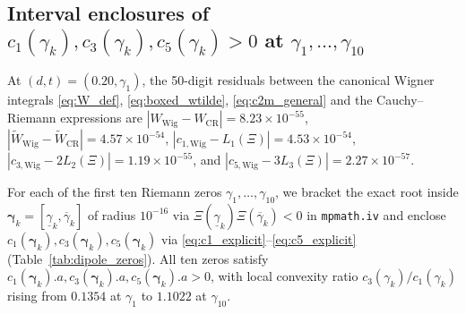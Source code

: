 \documentclass[11pt,a4paper,reqno]{amsart}
\theoremstyle{definition}
\theoremstyle{remark}
\numberwithin{equation}{section}
\newcommand{\Wtil}{\widetilde{W}}
\begin{document}
\subsection{Interval enclosures of \texorpdfstring{$c_1(\gamma_k), c_3(\gamma_k), c_5(\gamma_k) > 0$}{c1, c3, c5 > 0} at \texorpdfstring{$\gamma_1, \dots, \gamma_{10}$}{gamma\_1..gamma\_10}}\label{subsec:num_dipoles}

At $(d,t) = (0.20, \gamma_1)$, the 50-digit residuals between the canonical Wigner integrals \eqref{eq:W_def}, \eqref{eq:boxed_wtilde}, \eqref{eq:c2m_general} and the Cauchy--Riemann expressions are $|W_{\mathrm{Wig}} - W_{\mathrm{CR}}| = 8.23 \times 10^{-55}$, $|\Wtil_{\mathrm{Wig}} - \Wtil_{\mathrm{CR}}| = 4.57 \times 10^{-54}$, $|c_{1,\mathrm{Wig}} - L_1(\Xi)| = 4.53 \times 10^{-54}$, $|c_{3,\mathrm{Wig}} - 2L_2(\Xi)| = 1.19 \times 10^{-55}$, and $|c_{5,\mathrm{Wig}} - 3L_3(\Xi)| = 2.27 \times 10^{-57}$.

For each of the first ten Riemann zeros $\gamma_1, \dots, \gamma_{10}$, we bracket the exact root inside $\boldsymbol{\gamma}_k = [\underline{\gamma}_k, \overline{\gamma}_k]$ of radius $10^{-16}$ via $\Xi(\underline{\gamma}_k)\Xi(\overline{\gamma}_k) < 0$ in \texttt{mpmath.iv} and enclose $c_1(\boldsymbol{\gamma}_k), c_3(\boldsymbol{\gamma}_k), c_5(\boldsymbol{\gamma}_k)$ via \eqref{eq:c1_explicit}--\eqref{eq:c5_explicit} (Table~\ref{tab:dipole_zeros}). All ten zeros satisfy $c_1(\boldsymbol{\gamma}_k).a, c_3(\boldsymbol{\gamma}_k).a, c_5(\boldsymbol{\gamma}_k).a > 0$, with local convexity ratio $c_3(\gamma_k)/c_1(\gamma_k)$ rising from $0.1354$ at $\gamma_1$ to $1.1022$ at $\gamma_{10}$.
\end{document}
